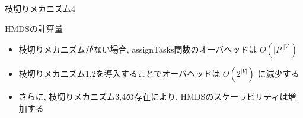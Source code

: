 \begin{frame}{枝切りメカニズム4}
\end{frame}

\begin{frame}{HMDSの計算量}
    \begin{itemize}
        \item 枝切りメカニズムがない場合, assignTasks関数のオーバヘッドは $O(|P|^{|V|})$
        \item 枝切りメカニズム1,2を導入することでオーバヘッドは $O(2^{|V|})$ に減少する
        \item さらに, 枝切りメカニズム3,4の存在により, HMDSのスケーラビリティは増加する
    \end{itemize}
\end{frame}
